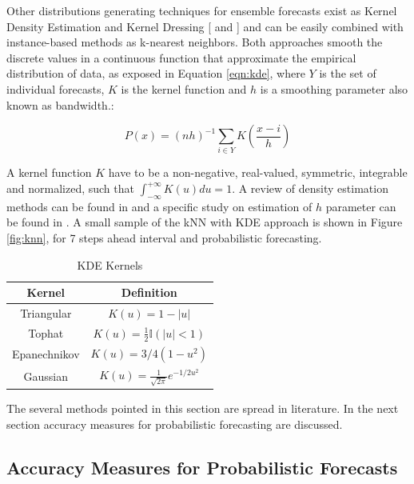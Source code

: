 
Other distributions generating techniques for ensemble forecasts exist as Kernel Density Estimation \citep{Hong2016a} and Kernel Dressing [ \citep{Pinson2009} and \citep{Brocker2008}] and can be easily combined with instance-based methods as k-nearest neighbors. Both approaches smooth the discrete values in a continuous function that approximate the empirical distribution of data, as exposed in Equation \ref{eqn:kde}, where $Y$ is the set of individual forecasts, $K$ is the kernel function and $h$ is a smoothing parameter also known as bandwidth.:

\begin{equation}
P(x) = (nh)^{-1} \sum_{i \in Y} K\left(\frac{x - i}{h}\right)
\label{eqn:kde}
\end{equation}

A kernel function $K$ have to be a non-negative, real-valued, symmetric, integrable and normalized, such that $\int_{-\infty}^{+\infty}K(u) du = 1$. A review of density estimation methods can be found in \cite{Silverman1986} and a specific study on estimation of $h$ parameter can be found in \cite{Sheather1991}. A small sample of the kNN with KDE approach is shown in Figure \ref{fig:knn}, for 7 steps ahead interval and probabilistic forecasting. 

\begin{table}[]
    \centering
    \begin{tabular}{|c|c|} \hline
        \textbf{Kernel} & \textbf{Definition} \\ \hline
        Triangular & $K(u) = 1 - |u|$ \\ \hline
        Tophat & $K(u) = \frac{1}{2}\mathbb{I}(|u| < 1)$ \\ \hline
        Epanechnikov & $K(u) = 3/4(1-u^2)$ \\ \hline
        Gaussian & $K(u) = \frac{1}{\sqrt{2\pi}}e^{-1/2u^2}$ \\  \hline
    \end{tabular}
    \caption{KDE Kernels}
    \label{tab:kde_kernels}
\end{table}

The several methods pointed in this section are spread in literature. In the next section accuracy measures for probabilistic forecasting are discussed.

%
\subsection{Accuracy Measures for Probabilistic Forecasts}
\label{sec:prob_probabilistic_measure}

